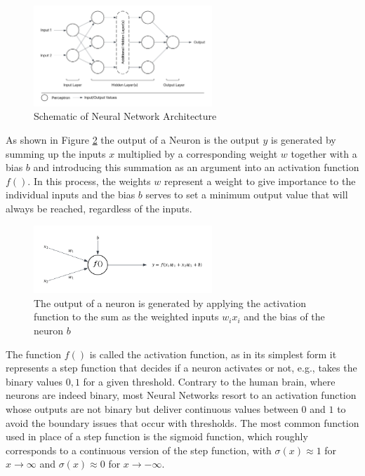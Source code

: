 \documentclass[preprint,12pt]{elsarticle}
\begin{document}
\begin{figure}[h] 
	\centering
	\includegraphics[width=0.6\textwidth]{../figures/modelling/neural_network_concept.png} %
	\caption{Schematic of Neural Network Architecture}
	\label{fig:neural_network_architecture}
\end{figure}

As shown in Figure \ref{fig:neuron_calculations} the output of a Neuron is  the output $y$ is generated by summing up the inputs $x$ multiplied by a corresponding weight $w$ together with a bias $b$ and introducing this summation as an argument into an activation function $f()$. In this process, the weights $w$ represent a weight to give importance to the individual inputs and the bias $b$ serves to set a minimum output value that will always be reached, regardless of the inputs. 

\begin{figure}[h] 
	\centering
	\includegraphics[width=0.6\textwidth]{../figures/modelling/perceptron_concept.png} %
	\caption{The output of a neuron is generated by applying the activation function to the sum as the weighted inputs $w_ix_i$ and the bias of the neuron $b$}
	\label{fig:neuron_calculations}
\end{figure}

The function $f()$ is called the activation function, as in its simplest form it represents a step function that decides if a neuron activates or not, e.g., takes the binary values ${0,1}$ for a given threshold. Contrary to the human brain, where neurons are indeed binary, most Neural Networks resort to an activation function whose outputs are not binary but deliver continuous values between $0$ and $1$ to avoid the boundary issues that occur with thresholds. The most common function used in place of a step function is the sigmoid function, which roughly corresponds to a continuous version of the step function, with $\sigma(x) \approx 1$ for $x \to \infty$ and $\sigma(x) \approx 0$ for $x \to -\infty$.
\end{document}
